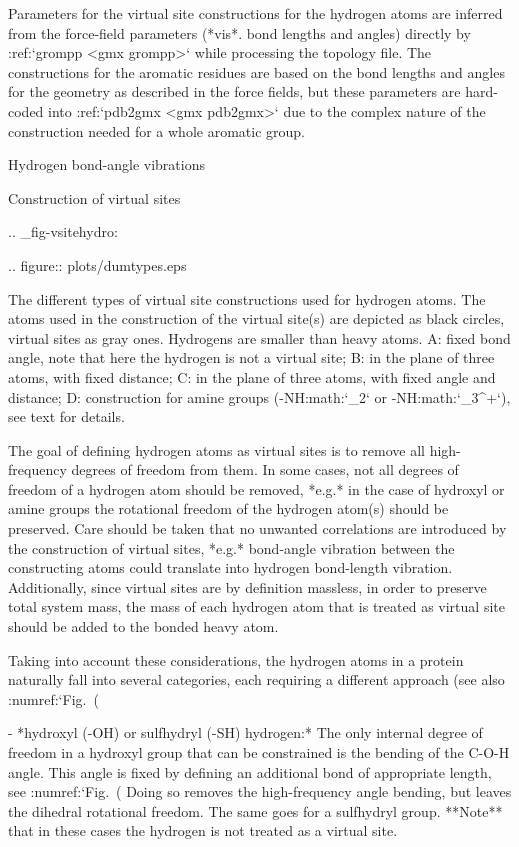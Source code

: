 Parameters for the virtual site constructions for the hydrogen atoms are
inferred from the force-field parameters (*vis*. bond lengths and
angles) directly by :ref:`grompp <gmx grompp>`
while processing the topology file. The constructions for the aromatic
residues are based on the bond lengths and angles for the geometry as
described in the force fields, but these parameters are hard-coded into
:ref:`pdb2gmx <gmx pdb2gmx>` due to the complex
nature of the construction needed for a whole aromatic group.

Hydrogen bond-angle vibrations
^^^^^^^^^^^^^^^^^^^^^^^^^^^^^^

Construction of virtual sites
~~~~~~~~~~~~~~~~~~~~~~~~~~~~~

.. _fig-vsitehydro:

.. figure:: plots/dumtypes.eps

   The different types of virtual site constructions used for hydrogen
   atoms. The atoms used in the construction of the virtual site(s) are
   depicted as black circles, virtual sites as gray ones. Hydrogens are
   smaller than heavy atoms. A: fixed bond angle, note
   that here the hydrogen is not a virtual site; B: in
   the plane of three atoms, with fixed distance; C: in
   the plane of three atoms, with fixed angle and distance;
   D: construction for amine groups
   (-NH:math:`_2` or -NH:math:`_3^+`),
   see text for details.

The goal of defining hydrogen atoms as virtual sites is to remove all
high-frequency degrees of freedom from them. In some cases, not all
degrees of freedom of a hydrogen atom should be removed, *e.g.* in the
case of hydroxyl or amine groups the rotational freedom of the hydrogen
atom(s) should be preserved. Care should be taken that no unwanted
correlations are introduced by the construction of virtual sites, *e.g.*
bond-angle vibration between the constructing atoms could translate into
hydrogen bond-length vibration. Additionally, since virtual sites are by
definition massless, in order to preserve total system mass, the mass of
each hydrogen atom that is treated as virtual site should be added to
the bonded heavy atom.

Taking into account these considerations, the hydrogen atoms in a
protein naturally fall into several categories, each requiring a
different approach (see also :numref:`Fig. (%

-  *hydroxyl (-OH) or sulfhydryl (-SH) hydrogen:* 
   The only internal degree of freedom in a hydroxyl group
   that can be constrained is the bending of the C-O-H
   angle. This angle is fixed by defining an additional bond of
   appropriate length, see :numref:`Fig. (%
   Doing so removes the high-frequency angle bending, but leaves the
   dihedral rotational freedom. The same goes for a sulfhydryl group.
   **Note** that in these cases the hydrogen is not treated as a virtual
   site.

